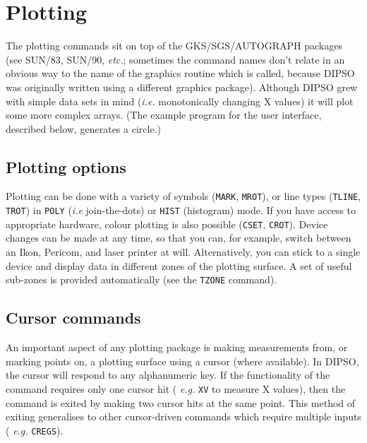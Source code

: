 \documentclass[twoside,11pt]{article}
\newcommand{\htmlref}[2]{#1}
\newcommand{\xref}[3]{#1}
\renewcommand{\_}{\texttt{\symbol{95}}}
\begin{document}
\section {Plotting}

The plotting commands sit on top of the GKS/SGS/AUTOGRAPH packages (see
\xref{SUN/83}{sun83}{}, \xref{SUN/90}{sun90}{}, {\em etc.}; sometimes the
command names don't relate in an obvious way to the name of the graphics
routine which is called, because DIPSO was originally written using a
different graphics package). Although DIPSO grew with simple data sets in
mind ({\em i.e.} monotonically changing X values) it will plot some more
complex arrays. (The example program for the user interface, described
below, generates a circle.)

\subsection {Plotting options}

Plotting can be done with a variety of symbols (\htmlref{{\tt{MARK}}}{COM:MARK},  \htmlref{{\tt{MROT}}}{COM:MROT}), 
or line types (\htmlref{{\tt{TLINE}}}{COM:TLINE},  \htmlref{{\tt{TROT}}}{COM:TROT})  in \htmlref{{\tt{POLY}}}{COM:POLY}  ({\em i.e}
join-the-dots) or \htmlref{{\tt{HIST}}}{COM:HIST}  (histogram) mode. If you have access to
appropriate hardware, colour plotting is also possible (\htmlref{{\tt{CSET}}}{COM:CSET}, 
\htmlref{{\tt{CROT}}}{COM:CROT}).  Device changes can be made at any time, so that you can, for
example, switch between an Ikon, Pericom, and laser printer at will.
Alternatively, you can stick to a single device and display data in
different zones of the plotting surface. A set of useful sub-zones is
provided automatically (see the \htmlref{{\tt{TZONE}}}{COM:TZONE}  command).

\subsection {Cursor commands}

An important aspect of any plotting package is making measurements
from, or marking points on, a plotting surface using a cursor (where
available). In DIPSO, the cursor will respond to any alphanumeric key.
If the functionality of the command requires only one cursor hit ({\em
e.g.} \htmlref{{\tt{XV}}}{COM:XV}  to measure X values), then the command is exited by making
two cursor hits at the same point. This method of exiting generalises
to other cursor-driven commands which require multiple inputs ({\em
e.g.} \htmlref{{\tt{CREGS}}}{COM:CREGS}). 
\end{document}
